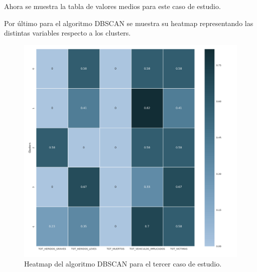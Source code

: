 	Ahora se muestra la tabla de valores medios para este caso de estudio.
	
	\begin{table}[H]
		\centering
		\caption{Tabla de valores medios del algoritmo DBSCAN para el tercer caso de estudio.}
	\end{table}

	Por último para el algoritmo DBSCAN se muestra su heatmap representando las distintas variables respecto a los clusters.
	
	\begin{figure}[H]
		\centering
		\includegraphics[scale=0.4]{heatmaps/DBSCAN-WetOverturnedAccidents-Heatmap.png}
		\caption{Heatmap del algoritmo DBSCAN para el tercer caso de estudio.}
	\end{figure}

